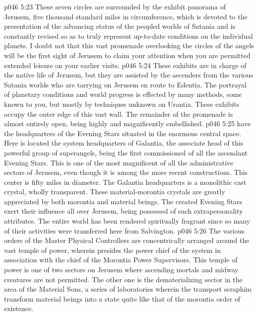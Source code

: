 \vs p046 5:23 These seven circles are surrounded by the exhibit panorama of Jerusem, five thousand standard miles in circumference, which is devoted to the presentation of the advancing status of the peopled worlds of Satania and is constantly revised so as to truly represent up\hyp{}to\hyp{}date conditions on the individual planets. I doubt not that this vast promenade overlooking the circles of the angels will be the first sight of Jerusem to claim your attention when you are permitted extended leisure on your earlier visits.
\vs p046 5:24 These exhibits are in charge of the native life of Jerusem, but they are assisted by the ascenders from the various Satania worlds who are tarrying on Jerusem en route to Edentia. The portrayal of planetary conditions and world progress is effected by many methods, some known to you, but mostly by techniques unknown on Urantia. These exhibits occupy the outer edge of this vast wall. The remainder of the promenade is almost entirely open, being highly and magnificently embellished.
\pc \vs p046 5:25 \bibnobreakspace {} have the headquarters of the Evening Stars situated in the enormous central space. Here is located the system headquarters of Galantia, the associate head of this powerful group of superangels, being the first commissioned of all the ascendant Evening Stars. This is one of the most magnificent of all the administrative sectors of Jerusem, even though it is among the more recent constructions. This center is fifty miles in diameter. The Galantia headquarters is a monolithic cast crystal, wholly transparent. These material\hyp{}morontia crystals are greatly appreciated by both morontia and material beings. The created Evening Stars exert their influence all over Jerusem, being possessed of such extrapersonality attributes. The entire world has been rendered spiritually fragrant since so many of their activities were transferred here from Salvington.
\pc \vs p046 5:26 \bibnobreakspace {} The various orders of the Master Physical Controllers are concentrically arranged around the vast temple of power, wherein presides the power chief of the system in association with the chief of the Morontia Power Supervisors. This temple of power is one of two sectors on Jerusem where ascending mortals and midway creatures are not permitted. The other one is the dematerializing sector in the area of the Material Sons, a series of laboratories wherein the transport seraphim transform material beings into a state quite like that of the morontia order of existence.
